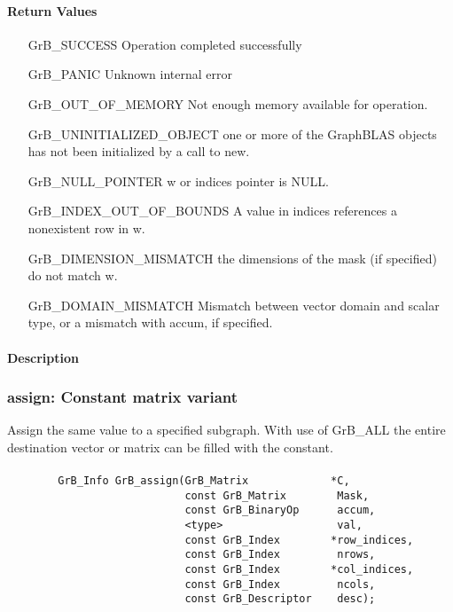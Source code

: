 \paragraph{Return Values}

\begin{itemize}[leftmargin=2.1in]
\item[{\sf GrB\_SUCCESS}]             Operation completed successfully
\item[{\sf GrB\_PANIC}]               Unknown internal error
\item[{\sf GrB\_OUT\_OF\_MEMORY}]            Not enough memory available for operation.
\item[{\sf GrB\_UNINITIALIZED\_OBJECT}]          one or more of the GraphBLAS objects has
                                    not been initialized by a call to {\sf new}.
\item[{\sf GrB\_NULL\_POINTER}]    {\sf w} or {\sf indices} pointer is {\sf NULL}.
\item[{\sf GrB\_INDEX\_OUT\_OF\_BOUNDS}]
        A value in indices references a nonexistent row in {\sf w}.
\item[{\sf GrB\_DIMENSION\_MISMATCH}] 
        the dimensions of the mask (if specified) do not match {\sf w}.
\item[{\sf GrB\_DOMAIN\_MISMATCH}]    Mismatch between vector domain and scalar type,
                                      or a mismatch with {\sf accum}, if specified.
\end{itemize}


\paragraph{Description}

\subsubsection{{\sf assign}: Constant matrix variant}

Assign the same value to a specified subgraph.  With use of {\sf GrB\_ALL} the entire
destination vector or matrix can be filled with the constant.

\paragraph{\syntax}

\begin{verbatim}
        GrB_Info GrB_assign(GrB_Matrix             *C,
                            const GrB_Matrix        Mask,
                            const GrB_BinaryOp      accum,
                            <type>                  val,
                            const GrB_Index        *row_indices,
                            const GrB_Index         nrows,
                            const GrB_Index        *col_indices,
                            const GrB_Index         ncols,
                            const GrB_Descriptor    desc);
\end{verbatim}

